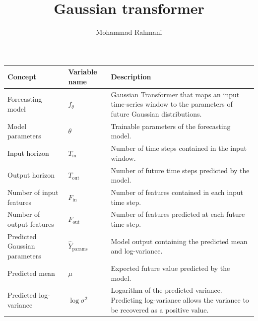 \documentclass[a4paper]{article}
\title{Gaussian transformer}
\date{}
\author{Mohammad Rahmani}
\begin{document}
   \maketitle
   \begin{table}[H]

      \centering

      \small

      \setlength{\tabcolsep}{4pt}

      \begin{tabular}{p{} p{} p{}}

         \hline

         \textbf{Concept} & \textbf{Variable name} & \textbf{Description} \\

         \hline

         Forecasting model
         & $f_{\theta}$
         & Gaussian Transformer that maps an input time-series window to the parameters of future Gaussian distributions. \\

         Model parameters
         & $\theta$
         & Trainable parameters of the forecasting model. \\

         Input horizon
         & $T_{\mathrm{in}}$
         & Number of time steps contained in the input window. \\

         Output horizon
         & $T_{\mathrm{out}}$
         & Number of future time steps predicted by the model. \\

         Number of input features
         & $F_{\mathrm{in}}$
         & Number of features contained in each input time step. \\

         Number of output features
         & $F_{\mathrm{out}}$
         & Number of features predicted at each future time step. \\

         Predicted Gaussian parameters
         & $\hat{Y}_{\mathrm{params}}$
         & Model output containing the predicted mean and log-variance. \\

         Predicted mean
         & $\mu$
         & Expected future value predicted by the model. \\

         Predicted log-variance
         & $\log \sigma^2$
         & Logarithm of the predicted variance. Predicting log-variance allows the variance to be recovered as a positive value. \\


\end{tabular}
\end{table}
\end{document}
